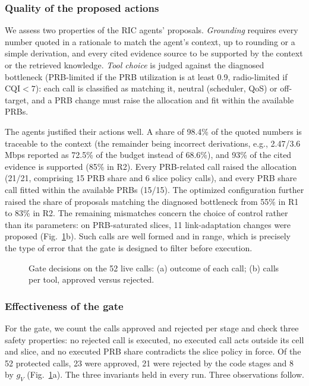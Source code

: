 \documentclass[conference]{IEEEtran}
\begin{document}
\subsubsection{Quality of the proposed actions}
We assess two properties of the RIC agents' proposals. \emph{Grounding} requires
every number quoted in a rationale to match the agent's context, up to rounding
or a simple derivation, and every cited evidence source to be supported by the
context or the retrieved knowledge. \emph{Tool choice} is judged against the
diagnosed bottleneck (PRB-limited if the PRB utilization is at least 0.9,
radio-limited if CQI${}<7$): each call is classified as matching it, neutral
(scheduler, QoS) or off-target, and a PRB change must raise the allocation and
fit within the available PRBs.

The agents justified their actions well. A share of 98.4\% of the quoted numbers
is traceable to the context (the remainder being incorrect derivations, e.g.,
2.47/3.6\,Mbps reported as 72.5\% of the budget instead of 68.6\%), and 93\% of
the cited evidence is supported (85\% in R2). Every PRB-related call raised the
allocation (21/21, comprising 15 PRB share and 6 slice policy calls), and every
PRB share call fitted within the available PRBs (15/15). The optimized
configuration further raised the share of proposals matching the diagnosed
bottleneck from 55\% in R1 to 83\% in R2. The remaining mismatches concern the
choice of control rather than its parameters: on PRB-saturated slices, 11
link-adaptation changes were proposed (Fig.~\ref{fig:live}b). Such calls are
well formed and in range, which is precisely the type of error that the gate is
designed to filter before execution.
\begin{figure}[!t]
\centering

\caption{Gate decisions on the 52 live calls: (a) outcome of each call; (b) calls per tool, approved versus rejected.}
\label{fig:live}
\end{figure}
\subsubsection{Effectiveness of the gate}\label{sec:gate}
For the gate, we count the calls approved and rejected per stage and check three
safety properties: no rejected call is executed, no executed call acts outside
its cell and slice, and no executed PRB share contradicts the slice policy in
force. Of the 52 protected calls, 23 were approved, 21 were rejected by the code
stages and 8 by $g_V$ (Fig.~\ref{fig:live}a). The three invariants held in every
run. Three observations follow.
\end{document}
